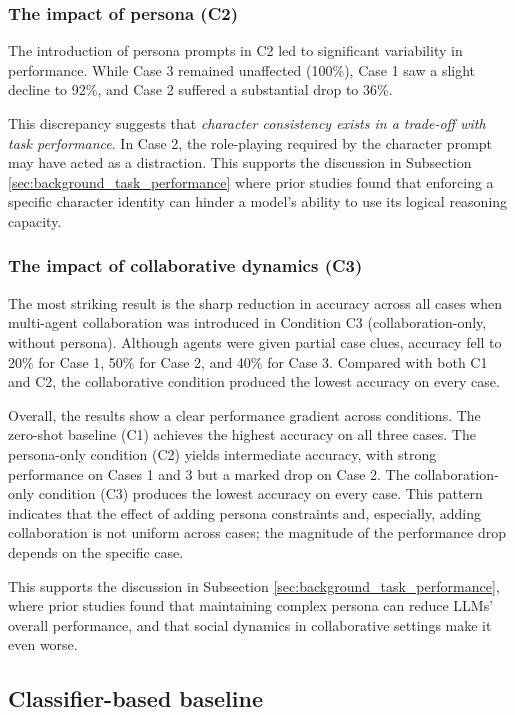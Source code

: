 \documentclass{article}
\begin{document}
\subsubsection{The impact of persona (C2)}

The introduction of persona prompts in C2 led to significant variability in performance. While Case 3 remained unaffected (100\%), Case 1 saw a slight decline to 92\%, and Case 2 suffered a substantial drop to 36\%.

This discrepancy suggests that \emph{character consistency exists in a trade-off with task performance}. In Case 2, the role-playing required by the character prompt may have acted as a distraction. This supports the discussion in Subsection \ref{sec:background_task_performance} where prior studies found that enforcing a specific character identity can hinder a model's ability to use its logical reasoning capacity.

\subsubsection{The impact of collaborative dynamics (C3)}

The most striking result is the sharp reduction in accuracy across all cases when multi-agent collaboration was introduced in Condition C3 (collaboration-only, without persona). Although agents were given partial case clues, accuracy fell to 20\% for Case 1, 50\% for Case 2, and 40\% for Case 3. Compared with both C1 and C2, the collaborative condition produced the lowest accuracy on every case.

Overall, the results show a clear performance gradient across conditions. The zero-shot baseline (C1) achieves the highest accuracy on all three cases. The persona-only condition (C2) yields intermediate accuracy, with strong performance on Cases 1 and 3 but a marked drop on Case 2. The collaboration-only condition (C3) produces the lowest accuracy on every case. This pattern indicates that the effect of adding persona constraints and, especially, adding collaboration is not uniform across cases; the magnitude of the performance drop depends on the specific case. 

This supports the discussion in Subsection \ref{sec:background_task_performance}, where prior studies found that maintaining complex persona can reduce LLMs' overall performance, and that social dynamics in collaborative settings make it even worse.

\subsection{Classifier-based baseline} \label{sec:results_classifier}
\end{document}
